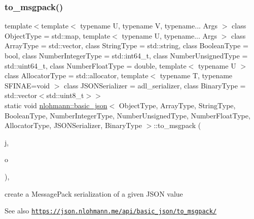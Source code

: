 \subsubsection{\texorpdfstring{to\+\_\+msgpack()}{to\_msgpack()}\hspace{0.1cm}{\footnotesize\ttfamily [3/3]}}
{\footnotesize\ttfamily template$<$template$<$ typename U, typename V, typename... Args $>$ class Object\+Type = std\+::map, template$<$ typename U, typename... Args $>$ class Array\+Type = std\+::vector, class String\+Type  = std\+::string, class Boolean\+Type  = bool, class Number\+Integer\+Type  = std\+::int64\+\_\+t, class Number\+Unsigned\+Type  = std\+::uint64\+\_\+t, class Number\+Float\+Type  = double, template$<$ typename U $>$ class Allocator\+Type = std\+::allocator, template$<$ typename T, typename S\+F\+I\+N\+A\+E=void $>$ class J\+S\+O\+N\+Serializer = adl\+\_\+serializer, class Binary\+Type  = std\+::vector$<$std\+::uint8\+\_\+t$>$$>$ \\
static void \hyperlink{classnlohmann_1_1basic__json}{nlohmann\+::basic\+\_\+json}$<$ Object\+Type, Array\+Type, String\+Type, Boolean\+Type, Number\+Integer\+Type, Number\+Unsigned\+Type, Number\+Float\+Type, Allocator\+Type, J\+S\+O\+N\+Serializer, Binary\+Type $>$\+::to\+\_\+msgpack (\begin{DoxyParamCaption}\item[{const \hyperlink{classnlohmann_1_1basic__json}{basic\+\_\+json}$<$ Object\+Type, Array\+Type, String\+Type, Boolean\+Type, Number\+Integer\+Type, Number\+Unsigned\+Type, Number\+Float\+Type, Allocator\+Type, J\+S\+O\+N\+Serializer, Binary\+Type $>$ \&}]{j,  }\item[{\hyperlink{classnlohmann_1_1detail_1_1output__adapter}{detail\+::output\+\_\+adapter}$<$ char $>$}]{o }\end{DoxyParamCaption})\hspace{0.3cm}{\ttfamily [inline]}, {\ttfamily [static]}}



create a Message\+Pack serialization of a given J\+S\+ON value 

\begin{DoxySeeAlso}{See also}
\href{https://json.nlohmann.me/api/basic_json/to_msgpack/}{\tt https\+://json.\+nlohmann.\+me/api/basic\+\_\+json/to\+\_\+msgpack/} 
\end{DoxySeeAlso}
\mbox{\label{classnlohmann_1_1basic__json_a2c71cbd82dcf82ac92021ddf476e469d}} 
